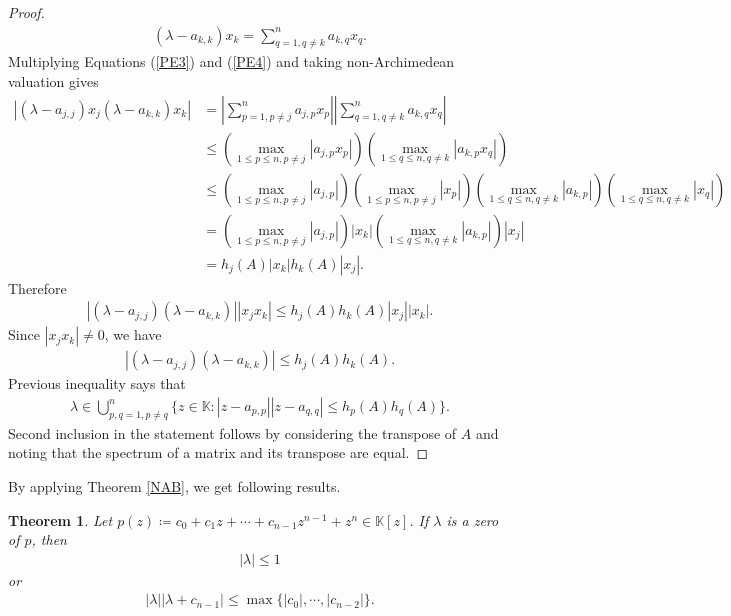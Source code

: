 \documentclass{amsart}
\newtheorem{theorem}{Theorem}[section]
\begin{document}
\begin{proof}
\begin{align}
	(\lambda -a_{k,k})x_k=\sum_{q=1, q\neq k}^na_{k,q}x_q.
\end{align}
Multiplying Equations (\ref{PE3}) and (\ref{PE4}) and taking non-Archimedean valuation gives
\begin{align*}
|(\lambda -a_{j,j})x_j	(\lambda -a_{k,k})x_k|&=\left|\sum_{p=1, p\neq j}^na_{j,p}x_p\right|\left|\sum_{q=1, q\neq k}^na_{k,q}x_q\right|\\
&\leq \left(\max_{1\leq p \leq n, p \neq j}|a_{j,p}x_p|\right)\left(\max_{1\leq q \leq n, q \neq k}|a_{k,p}x_q|\right)\\
&\leq \left(\max_{1\leq p \leq n, p \neq j}|a_{j,p}|\right)\left(\max_{1\leq p \leq n, p \neq j}|x_p|\right)\left(\max_{1\leq q \leq n, q \neq k}|a_{k,p}|\right)\left(\max_{1\leq q \leq n, q \neq k}|x_q|\right)\\
&=\left(\max_{1\leq p \leq n, p \neq j}|a_{j,p}|\right)|x_k|\left(\max_{1\leq q \leq n, q \neq k}|a_{k,p}|\right)|x_j|\\
&=h_j(A)|x_k|h_k(A)|x_j|.
\end{align*}
Therefore 
\begin{align*}
|(\lambda -a_{j,j})(\lambda -a_{k,k})||x_jx_k|\leq h_j(A)h_k(A)|x_j||x_k|.
\end{align*}
Since $|x_jx_k|\neq0$, we have 
\begin{align*}
|(\lambda -a_{j,j})(\lambda -a_{k,k})|\leq h_j(A)h_k(A).	
\end{align*}
Previous inequality says that 
\begin{align*}
	\lambda  \in \bigcup_{p, q=1, p \neq q}^n\{z \in \mathbb{K}: |z-a_{p,p}||z-a_{q,q}|\leq h_p(A)h_q(A)\}.
\end{align*}
Second inclusion in the statement follows by considering the transpose of $A$ and noting that the spectrum of a matrix and its transpose are equal.	
\end{proof}
By applying Theorem \ref{NAB}, we get following results.
\begin{theorem} 
	Let $p(z)\coloneqq c_0+c_1z+\cdots +c_{n-1}z^{n-1}+z^n \in \mathbb{K}[z]$.  If $\lambda$ is a  zero of $p$, then 
	\begin{align*}
		|\lambda|\leq 1
	\end{align*}
	or 
	\begin{align*}
		|\lambda||\lambda+c_{n-1}|\leq \max\{|c_0|, \cdots ,|c_{n-2}|\}.
	\end{align*}
\end{theorem}
\end{document}
